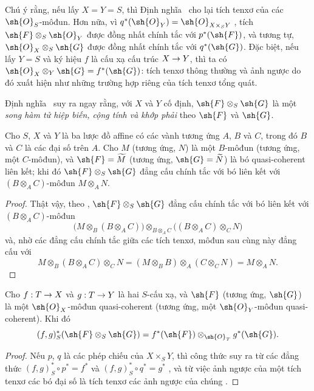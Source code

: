 \documentclass[oneside]{amsart}
\makeatletter
\newcommand{\ega@arrow}[2]{\mathchoice{#1}{#2}{#2}{#2}}
\renewcommand{\to}{\ega@arrow{\longrightarrow}{\rightarrow}}
\newcommand{\oldpage}[2][]{{\marginnote{\normalfont\textbf{#1}~|~#2}}\ignorespaces}
\let\EGAOriginalLabel\label
\renewcommand{\label}[1]{\phantomsection\EGAOriginalLabel{#1}}
\makeatother
\begin{document}
Chú ý rằng, nếu lấy $X=Y=S$, thì Định nghĩa~ cho lại tích
tenxơ của các $\sh{O}_S$-môđun. Hơn nữa, vì $q^*(\sh{O}_Y)=\sh{O}_{X\times_S Y}$
, tích $\sh{F}\otimes_S\sh{O}_Y$ được đồng nhất
chính tắc với $p^*(\sh{F})$, và tương tự,
$\sh{O}_X\otimes_S\sh{G}$ được đồng nhất chính tắc với $q^*(\sh{G})$. Đặc
biệt, nếu lấy $Y=S$ và ký hiệu $f$ là cấu xạ cấu trúc $X\to Y$,
thì ta có $\sh{O}_X\otimes_Y\sh{G}=f^*(\sh{G})$: tích tenxơ thông thường
và ảnh ngược do đó xuất hiện như những trường hợp riêng của tích
tenxơ tổng quát.

Định nghĩa~ suy ra ngay rằng, với $X$ và
$Y$ cố định, $\sh{F}\otimes_S\sh{G}$ là một \emph{song hàm tử hiệp biến, cộng tính và khớp phải} theo $\sh{F}$ và $\sh{G}$.

\begin{proposition}[9.1.3]
\label{I.9.1.3}
Cho $S$, $X$ và $Y$ là ba lược đồ affine có các vành
tương ứng $A$, $B$ và $C$, trong đó $B$ và $C$ là các đại số trên $A$. Cho $M$
(tương ứng, $N$) là một $B$-môđun (tương ứng, một $C$-môđun), và
$\sh{F}=\widetilde{M}$ (tương ứng, $\sh{G}=\widetilde{N}$) là
bó quasi-coherent liên kết; khi đó $\sh{F}\otimes_S\sh{G}$
đẳng cấu chính tắc với bó liên kết với $(B\otimes_A C)$-môđun
$M\otimes_A N$.
\end{proposition}

\begin{proof}
\oldpage[I]{170}
Thật vậy, theo , $\sh{F}\otimes_S\sh{G}$
đẳng cấu chính tắc với bó liên kết với $(B\otimes_A C)$-môđun
\[
  \big(M\otimes_B(B\otimes_A C)\big)\otimes_{B\otimes_A C}\big((B\otimes_A C)\otimes_C N\big)
\]
và, nhờ các đẳng cấu chính tắc giữa các tích tenxơ, môđun sau cùng này đẳng cấu với
\[
  M\otimes_B(B\otimes_A C)\otimes_C N=(M\otimes_B B)\otimes_A(C\otimes_C N)=M\otimes_A N.
\]
\end{proof}

\begin{proposition}[9.1.4]
\label{I.9.1.4}
Cho $f:T\to X$ và $g:T\to Y$ là hai $S$-cấu xạ, và $\sh{F}$ (tương ứng, $\sh{G}$) là một $\sh{O}_X$-môđun quasi-coherent (tương ứng, một $\sh{O}_Y$-môđun quasi-coherent).
Khi đó
\[
  (f,g)^*_S(\sh{F}\otimes_S\sh{G})=f^*(\sh{F})\otimes_{\sh{O}_T}g^*(\sh{G}).
\]
\end{proposition}

\begin{proof}
Nếu $p$, $q$ là các phép chiếu của $X\times_S Y$, thì công thức suy ra
từ các đẳng thức $(f,g)^*_S\circ p^*=f^*$ và
$(f,g)^*_S\circ q^*=g^*$ , và từ việc ảnh
ngược của một tích tenxơ các bó đại số là tích tenxơ các ảnh
ngược của chúng .
\end{proof}
\end{document}
